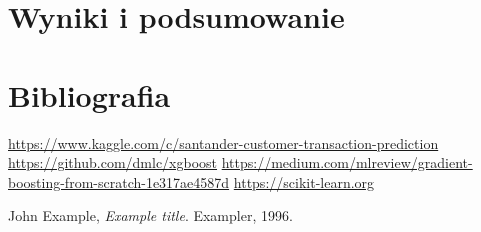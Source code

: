 \documentclass[12pt]{article}
\begin{document}
\section{Wyniki i podsumowanie}

\newpage

\section{Bibliografia}
\begin{thebibliography}{9}

\url{https://www.kaggle.com/c/santander-customer-transaction-prediction}
\url{https://github.com/dmlc/xgboost}
\url{https://medium.com/mlreview/gradient-boosting-from-scratch-1e317ae4587d}
\url{https://scikit-learn.org}

  John Example,
  \textit{Example title}.
  Exampler,
  1996.

\end{thebibliography}
\end{document}
